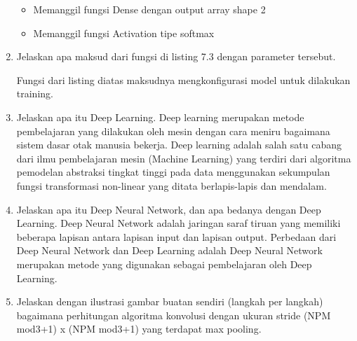 \begin{enumerate}
\begin{itemize}
		\item Memanggil fungsi Dense dengan output array shape 2
		\item Memanggil fungsi Activation tipe softmax
	\end{itemize}
	\item Jelaskan apa maksud dari fungsi di listing 7.3 dengan parameter tersebut.
	
	Fungsi dari listing diatas maksudnya mengkonfigurasi model untuk dilakukan training.
	\item Jelaskan apa itu Deep Learning.
	Deep learning merupakan metode pembelajaran yang dilakukan oleh mesin dengan cara meniru bagaimana sistem dasar otak manusia bekerja. Deep learning adalah salah satu cabang dari ilmu pembelajaran mesin (Machine Learning) yang terdiri dari algoritma pemodelan abstraksi tingkat tinggi pada data menggunakan sekumpulan fungsi transformasi non-linear yang ditata berlapis-lapis dan mendalam.
	\item Jelaskan apa itu Deep Neural Network, dan apa bedanya dengan Deep Learning.
	Deep Neural Network adalah jaringan saraf tiruan yang memiliki beberapa lapisan antara lapisan input dan lapisan output. Perbedaan dari Deep Neural Network dan Deep Learning adalah Deep Neural Network merupakan metode yang digunakan sebagai pembelajaran oleh Deep Learning.
	\item Jelaskan dengan ilustrasi gambar buatan sendiri (langkah per langkah) bagaimana perhitungan algoritma konvolusi dengan ukuran stride (NPM mod3+1) x (NPM mod3+1) yang terdapat max pooling.
\end{enumerate}
